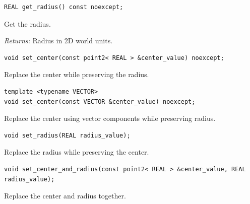 \par\noindent\begin{minipage}{\linewidth}
\begin{lstlisting}[style=apireference]
REAL get_radius() const noexcept;
\end{lstlisting}
{\footnotesize Get the radius.\par}
{\footnotesize\textit{Returns:} Radius in 2D world units.\par}
\end{minipage}\par\vspace{1pt}
\par\noindent\begin{minipage}{\linewidth}
\begin{lstlisting}[style=apireference]
void set_center(const point2< REAL > &center_value) noexcept;
\end{lstlisting}
{\footnotesize Replace the center while preserving the radius.\par}
\end{minipage}\par\vspace{1pt}
\par\noindent\begin{minipage}{\linewidth}
\begin{lstlisting}[style=apireference]
template <typename VECTOR>
void set_center(const VECTOR &center_value) noexcept;
\end{lstlisting}
{\footnotesize Replace the center using vector components while preserving radius.\par}
\end{minipage}\par\vspace{1pt}
\par\noindent\begin{minipage}{\linewidth}
\begin{lstlisting}[style=apireference]
void set_radius(REAL radius_value);
\end{lstlisting}
{\footnotesize Replace the radius while preserving the center.\par}
\end{minipage}\par\vspace{1pt}
\par\noindent\begin{minipage}{\linewidth}
\begin{lstlisting}[style=apireference]
void set_center_and_radius(const point2< REAL > &center_value, REAL radius_value);
\end{lstlisting}
{\footnotesize Replace the center and radius together.\par}
\end{minipage}\par\vspace{1pt}
